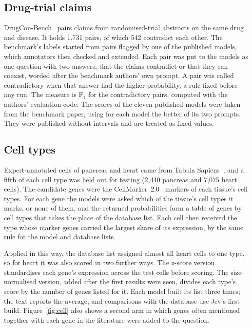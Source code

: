 \subsection{Drug-trial claims}
DrugCon-Bench~\cite{lan2026} pairs claims from randomised-trial abstracts on the same drug and disease. It holds 1,731 pairs, of which 542 contradict each other. The benchmark's labels started from pairs flagged by one of the published models, which annotators then checked and extended. Each pair was put to the models as one question with two answers, that the claims contradict or that they can coexist, worded after the benchmark authors' own prompt. A pair was called contradictory when that answer had the higher probability, a rule fixed before any run. The measure is F$_1$ for the contradictory pairs, computed with the authors' evaluation code. The scores of the eleven published models were taken from the benchmark paper, using for each model the better of its two prompts. They were published without intervals and are treated as fixed values.

\subsection{Cell types}
Expert-annotated cells of pancreas and heart came from Tabula Sapiens~\cite{tabula}, and a fifth of each cell type was held out for testing (2,440 pancreas and 7,075 heart cells). The candidate genes were the CellMarker~2.0~\cite{cellmarker} markers of each tissue's cell types. For each gene the models were asked which of the tissue's cell types it marks, or none of them, and the returned probabilities form a table of genes by cell types that takes the place of the database list. Each cell then received the type whose marker genes carried the largest share of its expression, by the same rule for the model and database lists.

Applied in this way, the database list assigned almost all heart cells to one type, so for heart it was also scored in two further ways. The z-score version standardises each gene's expression across the test cells before scoring. The size-normalised version, added after the first results were seen, divides each type's score by the number of genes listed for it. Each model built its list three times; the text reports the average, and comparisons with the database use Jev's first build. Figure~\ref{fig:cell} also shows a second arm in which genes often mentioned together with each gene in the literature were added to the question.

